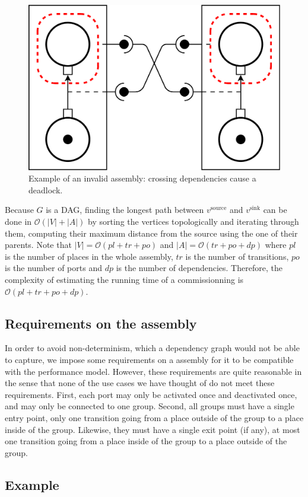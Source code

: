 \begin{figure}[h]
  \begin{center}
    \includegraphics[width=0.7\linewidth]{./images/deadlock.pdf}
  \end{center}
  \caption{Example of an invalid assembly: crossing dependencies cause a deadlock.}
  \label{fig:deadlock}
\end{figure}

Because $G$ is a DAG, finding the longest path between $v^\text{source}$
and $v^\text{sink}$ can be done in $\mathcal{O}(|V|+|A|)$ by sorting the
vertices topologically and iterating through them, computing their maximum
distance from the source using the one of their parents. Note that
$|V| = \mathcal{O}(pl+tr+po)$ and $|A| = \mathcal{O}(tr+po+dp)$ where $pl$
is the number of places in the whole assembly, $tr$ is the number of
transitions, $po$ is the number of ports and $dp$ is the number of
dependencies. Therefore, the complexity of estimating the running time of
a \mad commissionning is $\mathcal{O}(pl+tr+po+dp)$.


\subsection{Requirements on the assembly}

In order to avoid non-determinism, which a dependency graph would not be
able to capture, we impose some requirements on a \mad assembly
for it to be compatible with the performance model. However, these
requirements are quite reasonable in the sense that none of the use
cases we have thought of do not meet these requirements.
%
First, each port may only be activated once and deactivated once, and
may only be connected to one group. Second, all groups must have a
single entry point, \ie only one transition going from a place outside
of the group to a place inside of the group. Likewise, they must have a
single exit point (if any), \ie at most one transition going from a
place inside of the group to a place outside of the group.

\subsection{Example}

